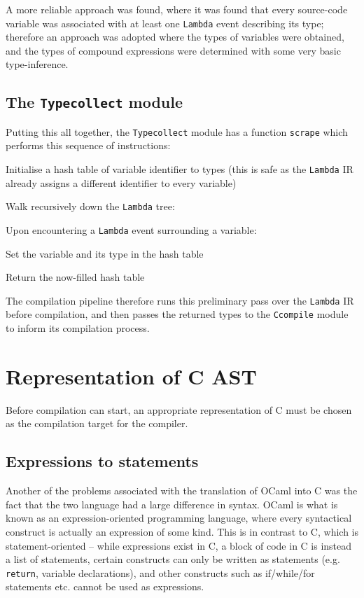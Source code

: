 \documentclass[12pt,a4paper,twoside,openright]{report}
\begin{document}
A more reliable approach was found, where it was found that every source-code 
variable was associated with at least one \texttt{Lambda} event describing its 
type; therefore an approach was adopted where the types of variables were 
obtained, and the types of compound expressions were determined with some very 
basic type-inference.

\subsection{The \texttt{Typecollect} module}

Putting this all together, the \texttt{Typecollect} module has a function 
\texttt{scrape} which performs this sequence of instructions:
\begin{enumerate}
    \item Initialise a hash table of variable identifier to types
    (this is safe as the \texttt{Lambda} IR already assigns a different 
    identifier to every variable)
    \item Walk recursively down the \texttt{Lambda} tree:
    {\setlength{\itemindent}{25pt} \item Upon encountering a \texttt{Lambda} 
    event surrounding a variable:}
    {\setlength{\itemindent}{50pt} \item Set the variable and its type in the 
    hash table}
    \item Return the now-filled hash table
\end{enumerate}

The compilation pipeline therefore runs this preliminary pass over the 
\texttt{Lambda} IR before compilation, and then passes the returned types to 
the \texttt{Ccompile} module to inform its compilation process.

\section{Representation of C AST}

Before compilation can start, an appropriate representation of C must be chosen 
as the compilation target for the compiler.

\subsection{Expressions to statements} \label{expr-stmt}

Another of the problems associated with the translation of OCaml into C was the 
fact that the two language had a large difference in syntax. OCaml is what is 
known as an expression-oriented programming language, where every syntactical 
construct is actually an expression of some kind. This is in contrast to C, 
which is statement-oriented -- while expressions exist in C, a block of code in 
C is instead a list of statements, certain constructs can only be written as 
statements (e.g. \texttt{return}, variable declarations), and other constructs 
such as if/while/for statements etc. cannot be used as expressions.
\end{document}
